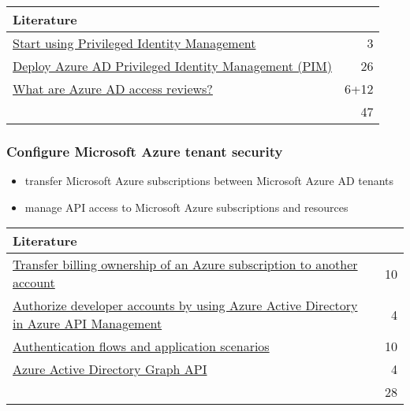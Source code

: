 \begin{tabular}{p{14cm} | r}
\textbf{Literature} & \\
\hline
\href{https://docs.microsoft.com/en-us/azure/active-directory/privileged-identity-management/pim-getting-started}{Start using Privileged Identity Management} & 3 \\
\href{https://docs.microsoft.com/en-us/azure/active-directory/privileged-identity-management/pim-deployment-plan}{Deploy Azure AD Privileged Identity Management (PIM)} & 26 \\
\href{https://docs.microsoft.com/en-us/azure/active-directory/governance/access-reviews-overview}{What are Azure AD access reviews?} & 6+12 \\
\cline{2-2} 
 & 47 \\
\end{tabular}

\subsubsection{Configure Microsoft Azure tenant security}
\begin{itemize}
\item transfer Microsoft Azure subscriptions between Microsoft Azure AD tenants 
\item manage API access to Microsoft Azure subscriptions and resources 
\end{itemize}

\begin{tabular}{p{14cm} | r}
\textbf{Literature} & \\
\hline
\href{https://docs.microsoft.com/en-us/azure/billing/billing-subscription-transfer}{Transfer billing ownership of an Azure subscription to another account} & 10 \\
\href{https://docs.microsoft.com/en-us/azure/api-management/api-management-howto-aad}{Authorize developer accounts by using Azure Active Directory in Azure API Management} & 4 \\
\href{https://docs.microsoft.com/en-us/azure/active-directory/develop/authentication-flows-app-scenarios}{Authentication flows and application scenarios} & 10 \\
\href{https://docs.microsoft.com/en-us/azure/active-directory/develop/active-directory-graph-api}{Azure Active Directory Graph API} & 4 \\
\cline{2-2} 
 & 28 \\
\end{tabular}

